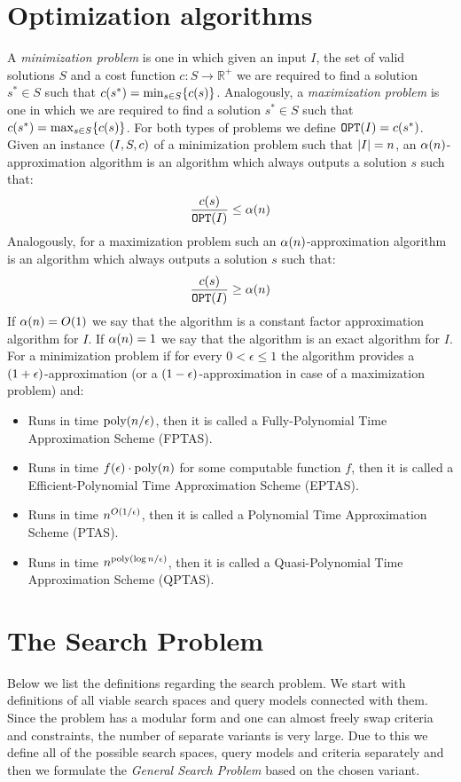 \section{Optimization algorithms}
A \textit{minimization problem} is one in which given an input $I$, the set of valid solutions $S$ and a cost function $c:S \to \mathbb{R}^+$ we are required to find a solution $s^*\in S$ such that $c\mathopen{}\left( s^* \right)=\min_{s\in S}\mathopen{}\left\{ c\mathopen{}\left( s \right) \right\}$. Analogously, a \textit{maximization problem} is one in which we are required to find a solution $s^*\in S$ such that $c\mathopen{}\left( s^* \right)=\max_{s\in S}\mathopen{}\left\{ c\mathopen{}\left( s \right) \right\}$. For both types of problems we define $\texttt{OPT}\mathopen{}\left( I \right) = c\mathopen{}\left( s^* \right)$. Given an instance $\mathopen{}\left( I, S, c \right)$ of a minimization problem such that $\mathopen{}\left| I \right| = n$, an $\alpha\mathopen{}\left( n \right)$-approximation algorithm is an algorithm which always outputs a solution $s$ such that:
$$
\frac{c\mathopen{}\left( s \right)}{\texttt{OPT}\mathopen{}\left( I \right)} \leq \alpha\mathopen{}\left( n \right)
$$
Analogously, for a maximization problem such an $\alpha\mathopen{}\left( n \right)$-approximation algorithm is an algorithm which always outputs a solution $s$ such that:
$$
\frac{c\mathopen{}\left( s \right)}{\texttt{OPT}\mathopen{}\left( I \right)} \geq \alpha\mathopen{}\left( n \right)
$$
If $\alpha\mathopen{}\left( n \right)=O\mathopen{}\left( 1 \right)$ we say that the algorithm is a constant factor approximation algorithm for $I$. If $\alpha\mathopen{}\left( n \right)=1$ we say that the algorithm is an exact algorithm for $I$. For a minimization problem if for every $0<\epsilon\leq1$ the algorithm provides a $\mathopen{}\left( 1+\epsilon \right)$-approximation (or a $\mathopen{}\left( 1-\epsilon \right)$-approximation in case of a maximization problem) and:
\begin{itemize}
    \item Runs in time $\text{poly}\mathopen{}\left( n/\epsilon \right)$, then it is called a Fully-Polynomial Time Approximation Scheme (FPTAS).
    \item Runs in time $f\mathopen{}\left( \epsilon \right)\cdot\text{poly}\mathopen{}\left( n \right)$ for some computable function $f$, then it is called a Efficient-Polynomial Time Approximation Scheme (EPTAS).
    \item Runs in time $n^{O\mathopen{}\left( 1/\epsilon \right)}$, then it is called a Polynomial Time Approximation Scheme (PTAS).
    \item Runs in time $n^{\text{poly}\mathopen{}\left( \log n/\epsilon \right)}$, then it is called a Quasi-Polynomial Time Approximation Scheme (QPTAS).
\end{itemize}

\section{The Search Problem}

Below we list the definitions regarding the search problem. We start with definitions of all viable search spaces and query models connected with them. Since the problem has a modular form and one can almost freely swap criteria and constraints, the number of separate variants is very large. Due to this we define all of the possible search spaces, query models and criteria separately and then we formulate the \textit{General Search Problem} based on the chosen variant.

